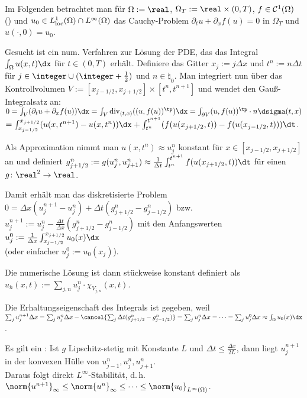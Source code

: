 \begin{Bem}
    Im Folgenden betrachtet man für $\Omega := \real$, $\Omega_T := \real \times (0, T)$,
    $f \in \mathcal{C}^1(\Omega)$ ()
    und $u_0 \in L^1_{\text{loc}}(\Omega) \cap L^\infty(\Omega)$
    das Cauchy-Problem $\partial_t u + \partial_x f(u) = 0$ in $\Omega_T$ und
    $u(\cdot, 0) = u_0$.

    Gesucht ist ein num. Verfahren zur Lösung der PDE, das das Integral
    $\int_\Omega u(x, t) \dx$ für $t \in (0, T)$ erhält.
    Definiere das Gitter $x_j := j \Delta x$ und $t^n := n \Delta t$ für
    $j \in \integer \cup (\integer + \frac{1}{2})$ und $n \in \natural_0$.
    Man integriert nun über das Kontrollvolumen $V := [x_{j-1/2}, x_{j+1/2}] \times [t^n, t^{n+1}]$
    und wendet den Gauß-Integralsatz an:
    $0 = \int_V (\partial_t u + \partial_x f(u)) \dx
    = \int_V \div_{(t,x)}((u, f(u))^\tp) \dx
    = \int_{\partial V} (u, f(u))^\tp \cdot n \dsigma(t, x)$\\
    $= \int_{x_{j-1/2}}^{x_{j+1/2}} (u(x, t^{n+1}) - u(x, t^n)) \dx +
    \int_{t^n}^{t^{n+1}} (f(u(x_{j+1/2}, t)) - f(u(x_{j-1/2}, t))) \dt$.

    Als Approximation nimmt man $u(x, t^n) \approx u_j^n$ konstant für
    $x \in [x_{j-1/2}, x_{j+1/2}]$ an und definiert
    $g_{j+1/2}^n := g(u_j^n, u_{j+1}^n) \approx
    \frac{1}{\Delta t} \int_{t^n}^{t^{n+1}} f(u(x_{j+1/2}, t)) \dt$
    für einen  $g\colon \real^2 \to \real$.

    Damit erhält man das diskretisierte Problem
    $0 = \Delta x (u_j^{n+1} - u_j^n) + \Delta t (g_{j+1/2}^n - g_{j-1/2}^n)$ bzw.\\
    $u_j^{n+1} := u_j^n - \frac{\Delta t}{\Delta x} (g_{j+1/2}^n - g_{j-1/2}^n)$
    mit den Anfangswerten $u_j^0 := \frac{1}{\Delta x} \int_{x_{j-1/2}}^{x_{j+1/2}} u_0(x) \dx$\\
    (oder einfacher $u_j^0 := u_0(x_j)$).

    Die numerische Lösung ist dann stückweise konstant definiert als
    $u_h(x, t) := \sum_{j,n} u_j^n \cdot \chi_{V_{j,n}}(x, t)$.
\end{Bem}

\linie

\begin{Bem}
    Die Erhaltungseigenschaft des Integrals ist gegeben, weil\\
    $\sum_j u_j^{n+1} \Delta x
    = \sum_j u_j^n \Delta x - \cancel{\sum_j \Delta t (g_{j+1/2}^n - g_{j-1/2}^n)}
    = \sum_j u_j^n \Delta x
    = \dotsb
    = \sum_j u_j^0 \Delta x
    \approx \int_\Omega u_0(x) \dx$.

    Es gilt ein :
    Ist $g$ Lipschitz-stetig mit Konstante $L$ und $\Delta t \le \frac{\Delta x}{2L}$,
    dann liegt $u_j^{n+1}$ in der konvexen Hülle von $u_{j-1}^n, u_j^n, u_{j+1}^n$.\\
    Daraus folgt direkt $L^\infty$-Stabilität,
    d.\,h. $\norm{u^{n+1}}_\infty \le \norm{u^n}_\infty \le \dotsb \le
    \norm{u_0}_{L^\infty(\Omega)}$.
\end{Bem}


